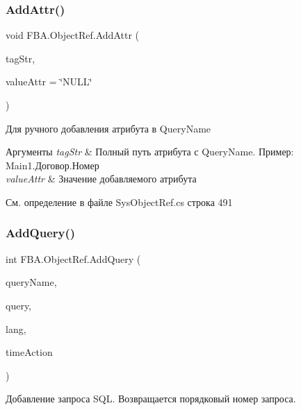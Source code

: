 \subsubsection{\texorpdfstring{Add\+Attr()}{AddAttr()}}
{\footnotesize\ttfamily void F\+B\+A.\+Object\+Ref.\+Add\+Attr (\begin{DoxyParamCaption}\item[{string}]{tag\+Str,  }\item[{string}]{value\+Attr = {\ttfamily \char`\"{}NULL\char`\"{}} }\end{DoxyParamCaption})}



Для ручного добавления атрибута в Query\+Name 


\begin{DoxyParams}{Аргументы}
{\em tag\+Str} & Полный путь атрибута с Query\+Name. Пример\+: Main1.\+Договор.\+Номер\\
\hline
{\em value\+Attr} & Значение добавляемого атрибута\\
\hline
\end{DoxyParams}


См. определение в файле Sys\+Object\+Ref.\+cs строка 491

\mbox{\label{class_f_b_a_1_1_object_ref_a76c73e2eeffba036dc5075da9b539e94}} 
\subsubsection{\texorpdfstring{Add\+Query()}{AddQuery()}}
{\footnotesize\ttfamily int F\+B\+A.\+Object\+Ref.\+Add\+Query (\begin{DoxyParamCaption}\item[{string}]{query\+Name,  }\item[{string}]{query,  }\item[{\mbox{\hyperlink{namespace_f_b_a_aa7137ed2c5f5027f13bb403ffc2b005e}{S\+Q\+L\+Lang}}}]{lang,  }\item[{\mbox{\hyperlink{namespace_f_b_a_a8f6da5d8d2dd8766bfe9052175a21970}{Time\+Action}}}]{time\+Action }\end{DoxyParamCaption})}



Добавление запроса S\+QL. Возвращается порядковый номер запроса. 


